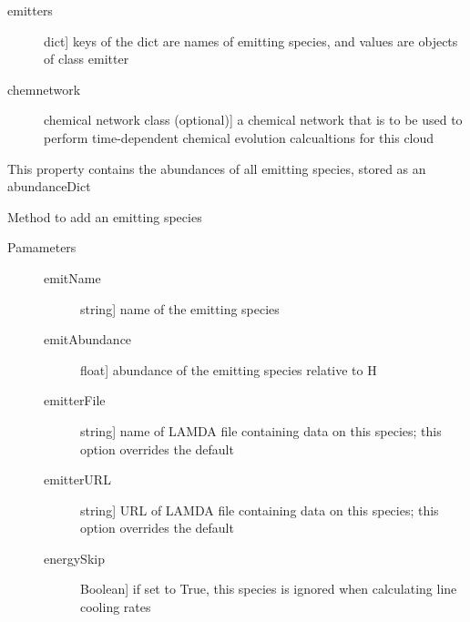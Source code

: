 \documentclass[letterpaper,10pt,english]{sphinxmanual}
\begin{document}
\begin{fulllineitems}
\begin{description}
\begin{description}
\item[{emitters}] \leavevmode{[}dict{]}
keys of the dict are names of emitting species, and values
are objects of class emitter

\item[{chemnetwork}] \leavevmode{[}chemical network class (optional){]}
a chemical network that is to be used to perform
time-dependent chemical evolution calcualtions for this cloud

\end{description}

\end{description}

\begin{fulllineitems}
\label{fulldoc:despotic.cloud.abundances}
This property contains the abundances of all emitting species,
stored as an abundanceDict

\end{fulllineitems}


\begin{fulllineitems}
\label{fulldoc:despotic.cloud.addEmitter}
Method to add an emitting species
\begin{description}
\item[{Pamameters}] \leavevmode\begin{description}
\item[{emitName}] \leavevmode{[}string{]}
name of the emitting species

\item[{emitAbundance}] \leavevmode{[}float{]}
abundance of the emitting species relative to H

\item[{emitterFile}] \leavevmode{[}string{]}
name of LAMDA file containing data on this species; this
option overrides the default

\item[{emitterURL}] \leavevmode{[}string{]}
URL of LAMDA file containing data on this species; this
option overrides the default

\item[{energySkip}] \leavevmode{[}Boolean{]}
if set to True, this species is ignored when calculating
line cooling rates


\end{description}
\end{description}
\end{fulllineitems}
\end{fulllineitems}
\end{document}
